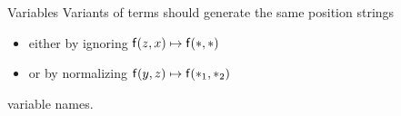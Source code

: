 

	
	\begin{block}{Variables}
		Variants of terms should generate the same position strings
		\begin{itemize}
			\item either by ignoring \hfill${\mathsf f}(z,x) \mapsto {\mathsf f}(*,*)$
			\item or by normalizing \hfill${\mathsf f}(y,z) \mapsto {\mathsf f}(*_1,*_2)$
		\end{itemize}
		variable names.
\end{block}